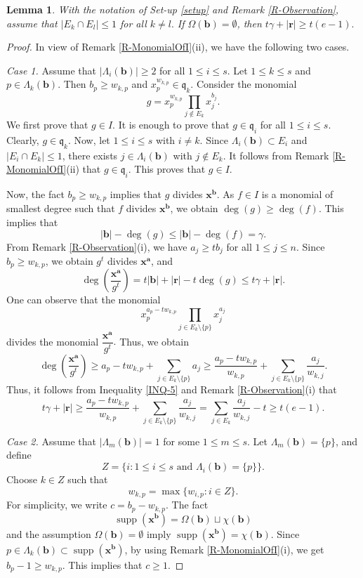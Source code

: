 \documentclass[12pt,reqno]{amsart}
\newtheorem{lemma}[thm]{Lemma}
\theoremstyle{definition}
\newcommand{\q}{\mathfrak{q}}
\newcommand{\x}{\mathbf{x}}
\newcommand{\ba}{\mathbf{a}}
\newcommand{\bb}{\mathbf{b}}
\newcommand{\br}{\mathbf{r}}
\newcommand{\C}{\chi}
\newcommand{\Om}{\Omega}
\newcommand{\Lm}{\Lambda}
\newcommand{\supp}[1]{\operatorname{supp}\left(#1\right)}
\numberwithin{equation}{section}
\begin{document}
\begin{lemma}\label{L-Tool03}
   With the notation of Set-up \ref{setup} and Remark \ref{R-Observation}, assume that $|E_k \cap E_l| \le 1$ for all $k \ne l.$ If $\Om(\bb) = \emptyset$, then $t\gamma + |\br| \ge t(e - 1).$
\end{lemma}

\begin{proof}
    In view of Remark \ref{R-MonomialOfI}(ii), we have the following two cases.

    \medskip\noindent
    \textit{Case 1.} Assume that $|\Lm_i(\bb)| \ge 2$ for all $1 \le i \le s.$ Let $1\le k \le s$ and $p \in \Lm_k(\bb).$ Then $b_p \ge w_{k, p}$ and $x_p^{w_{k, p}} \in \q_k.$ Consider the monomial 
    \[g = x_p^{w_{k, p}} \prod\limits_{j \notin E_k} x_j^{b_j}.\]
    We first prove that $g \in I.$ It is enough to prove that $g \in \q_i$ for all $1 \le i \le s.$ Clearly, $g \in \q_k.$ Now, let $1 \le i \le s$ with $i \ne k.$ Since $\Lm_i(\bb) \subset E_i$ and $|E_i \cap E_k| \le 1$, there exists $j \in \Lm_i(\bb)$ with $j \notin E_k.$ It follows from Remark \ref{R-MonomialOfI}(ii) that $g \in \q_i.$ This proves that $g \in I.$ 
    
    Now, the fact $b_p \ge w_{k, p}$ implies that $g$ divides $\x^{\bb}.$ As $f \in I$ is a monomial of smallest degree such that $f$ divides $\x^{\bb}$, we obtain $\deg(g) \ge \deg(f).$ This implies that 
    \[|\bb| - \deg(g) \le |\bb| - \deg(f) = \gamma.\]
    From Remark \ref{R-Observation}(i), we have $a_j \ge tb_j$ for all $1 \le j \le n.$ Since $b_p \ge w_{k, p}$, we obtain $g^t$ divides $\x^{\ba}$, and
    \begin{equation}\label{INQ-5}
        \deg\left( \dfrac{\x^{\ba}}{g^t} \right) = t|\bb| + |\br| - t\deg(g) \le t\gamma + |\br|.
    \end{equation}
    One can observe that the monomial 
    \[x_p^{a_p - tw_{k, p}} \prod\limits_{j \in E_k \setminus \{p\}} x_j^{a_j}\]
    divides the monomial $\dfrac{\x^{\ba}}{g^t}.$ Thus, we obtain
    \[\deg\left( \dfrac{\x^{\ba}}{g^t} \right) \ge a_p - tw_{k, p} + \sum_{j \in E_k \setminus \{p\}} a_j \ge \dfrac{a_p - tw_{k, p}}{w_{k, p}} + \sum_{j \in E_k \setminus \{p\}} \dfrac{a_j}{w_{k, j}}.\]
    Thus, it follows from Inequality \ref{INQ-5} and Remark \ref{R-Observation}(i) that
    \[t\gamma + |\br| \ge \dfrac{a_p - tw_{k, p}}{w_{k, p}} + \sum_{j \in E_k \setminus \{p\}} \dfrac{a_j}{w_{k, j}} = \sum_{j \in E_k} \dfrac{a_j}{w_{k, j}} - t \ge t(e - 1).\]

    \medskip\noindent
    \textit{Case 2.} Assume that  $|\Lm_m(\bb)| = 1$ for some $1 \le m \le s.$ Let $\Lm_m(\bb) = \{p\}$, and define 
    \[Z = \big\{ i : 1 \le i \le s \text{ and } \Lm_i(\bb) = \{p\} \big\}.\]
    Choose $k \in Z$ such that 
    \[w_{k, p} = \max \{w_{i, p} : i \in Z\}.\]
    For simplicity, we write $c = b_p - w_{k, p}.$ The fact 
    \[\supp{\x^{\bb}} = \Om(\bb) \sqcup \C(\bb)\]
    and the assumption $\Om(\bb) = \emptyset$ imply $\supp{\x^{\bb}} = \C(\bb).$ Since $p \in \Lm_k(\bb) \subset \supp{\x^{\bb}}$, by using Remark \ref{R-MonomialOfI}(i), we get $b_p - 1 \ge w_{k, p}.$ This implies that $c \ge 1.$ 
    

\end{proof}
\end{document}

